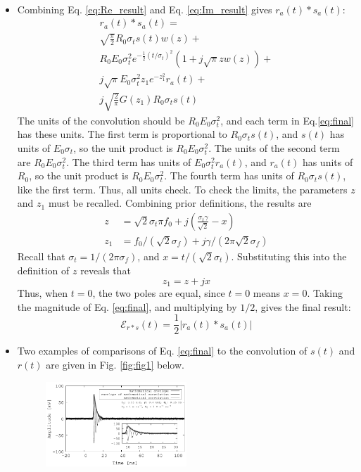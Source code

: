 \documentclass[amsmath,amssymb,aps,prd,10pt,twocolumn,showkeys]{revtex4}
\begin{document}
\begin{itemize}
\begin{multline}
\end{multline}
\item Combining Eq. \ref{eq:Re_result} and Eq. \ref{eq:Im_result} gives $r_a(t) * s_a(t)$:
\begin{multline}
r_a(t) * s_a(t) = \\
\sqrt{\frac{\pi}{2}}R_0 \sigma_t s(t) w(z) + \\
R_0 E_0 \sigma_t^2 e^{-\frac{1}{2}(t/\sigma_t)^2}(1+j\sqrt{\pi} z w(z)) + \\
j\sqrt{\pi}E_0 \sigma_t^2 z_1 e^{-z_1^2}r_a(t) + \\
j\sqrt{\frac{2}{\pi}} G(z_1) R_0 \sigma_t s(t) \label{eq:final}
\end{multline}
The units of the convolution should be $R_0 E_0\sigma_t^2$, and each term in Eq.\ref{eq:final} has these units.  The first term is proportional to $R_0 \sigma_t s(t)$, and $s(t)$ has units of $E_0 \sigma_t$, so the unit product is $R_0 E_0\sigma_t^2$.  The units of the second term are $R_0 E_0\sigma_t^2$.  The third term has units of $E_0\sigma_t^2 r_a(t)$, and $r_a(t)$ has units of $R_0$, so the unit product is $R_0 E_0\sigma_t^2$.  The fourth term has units of $R_0 \sigma_t s(t)$, like the first term.  Thus, all units check.  To check the limits, the parameters $z$ and $z_1$ must be recalled.  Combining prior definitions, the results are
\begin{align}
z &= \sqrt{2}\sigma_t \pi f_0 + j\left(\frac{\sigma_t\gamma}{\sqrt{2}} - x\right) \\
z_1 &= f_0/(\sqrt{2}\sigma_f) + j\gamma/(2\pi \sqrt{2} \sigma_f)
\end{align}
Recall that $\sigma_t = 1/(2\pi \sigma_f)$, and $x=t/(\sqrt{2}\sigma_t)$.  Substituting this into the definition of $z$ reveals that
\begin{equation}
z_1 = z + jx
\end{equation}
Thus, when $t=0$, the two poles are equal, since $t=0$ means $x=0$.  Taking the magnitude of Eq. \ref{eq:final}, and multiplying by $1/2$, gives the final result:
\begin{equation}
\mathcal{E}_{r * s}(t) = \frac{1}{2} | r_a(t) * s_a(t) |
\end{equation}
\item Two examples of comparisons of Eq. \ref{eq:final} to the convolution of $s(t)$ and $r(t)$ are given in Fig. \ref{fig:fig1} below.
\begin{figure}[hb]
\centering
\includegraphics[width=0.5\textwidth]{March12_plot1.pdf}

\end{figure}
\end{itemize}
\end{document}
